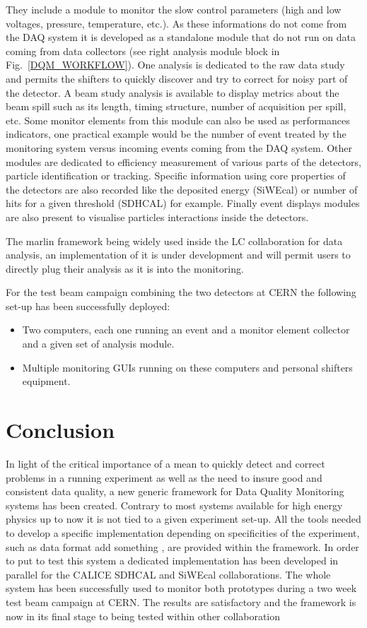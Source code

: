 \documentclass[conference]{IEEEtran}
\begin{document}
They include a module to monitor the slow control parameters (high and low voltages, pressure, temperature, etc.). As these informations do not come from the DAQ system it is developed as a standalone module that do not run on data coming from data collectors (see right analysis module block in Fig.~\ref{DQM_WORKFLOW}).
One analysis is dedicated to the raw data study and permits the shifters to quickly discover and try to correct for noisy part of the detector. A beam study analysis is available to display metrics about the beam spill such as its length, timing structure, number of acquisition per spill, etc. Some monitor elements from this module can also be used as performances indicators, one practical example would be the number of event treated by the monitoring system versus incoming events coming from the DAQ system.
Other modules are dedicated to efficiency measurement of various parts of the detectors, particle identification or tracking. Specific information using core properties of the detectors are also recorded like the deposited energy (SiWEcal) or number of hits for a given threshold (SDHCAL) for example. Finally event displays modules are also present to visualise particles interactions inside the detectors.

The marlin\cite{MARLIN} framework being widely used inside the LC collaboration for data analysis, an implementation of it is under development and will permit users to directly plug their analysis as it is into the monitoring.

For the test beam campaign combining the two detectors at CERN the following set-up has been successfully deployed:
  \begin{itemize}
  \item Two computers, each one running an event and a monitor element collector and a given set of analysis module.
  \item Multiple monitoring GUIs running on these computers and personal shifters equipment.
  \end{itemize}


\section{Conclusion}
In light of the critical importance of a mean to quickly detect and correct problems in a running experiment as well as the need to insure good and consistent data quality, a new generic framework for Data Quality Monitoring systems has been created. Contrary to most systems available for high energy physics up to now it is not tied to a given experiment set-up. All the tools needed to develop a specific implementation depending on specificities of the experiment, such as data format {\color{red}add something} , are provided within the framework.
In order to put to test this system a dedicated implementation has been developed in parallel for the CALICE SDHCAL and SiWEcal collaborations. The whole system has been successfully used to monitor both prototypes during a two week test beam campaign at CERN. The results are satisfactory and the framework is now in its final stage to being tested within other collaboration
\end{document}
